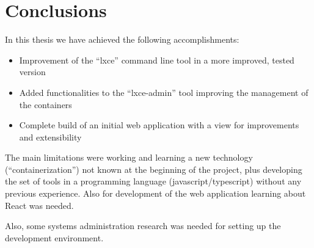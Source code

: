 \section{Conclusions}
In this thesis we have achieved the following accomplishments:
\begin{itemize}
	\item{Improvement of the ``lxce'' command line tool in a more improved, tested version}
	\item{Added functionalities to the ``lxce-admin'' tool improving the management of the containers}
	\item{Complete build of an initial web application with a view for improvements and extensibility}
\end{itemize}

The main limitations were working and learning a new technology (``containerization'') not known at the beginning of the project, plus developing the set of tools in a programming language (javascript/typescript) without any previous experience. Also for development of the web application learning about React was needed.

Also, some systems administration research was needed for setting up the development environment.
